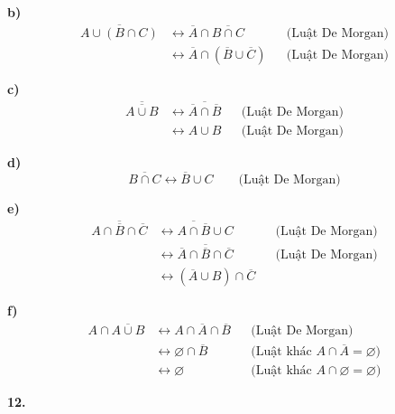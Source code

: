 \documentclass[12pt,a4paper]{article}
\theoremstyle{definition}
\begin{document}
\textbf{b)}
\begin{align*}
\overline{A \cup (B \cap C)} &\leftrightarrow \overline{A} \cap \overline{B \cap C} && \text{(Luật De Morgan)}\\
&\leftrightarrow \overline{A} \cap (\overline{B} \cup \overline{C}) && \text{(Luật De Morgan)}
\end{align*}

\textbf{c)}
\begin{align*}
\overline{\overline{A \cup B}} &\leftrightarrow \overline{\overline{A} \cap \overline{B}} && \text{(Luật De Morgan)}\\
&\leftrightarrow A \cup B && \text{(Luật De Morgan)}
\end{align*}

\textbf{d)}
\[\overline{B \cap C} \leftrightarrow \overline{B} \cup C \qquad \text{(Luật De Morgan)}\]

\textbf{e)}
\begin{align*}
\overline{A \cap \overline{B} \cap \overline{C}} &\leftrightarrow \overline{A \cap \overline{B}} \cup C && \text{(Luật De Morgan)}\\
&\leftrightarrow \overline{A} \cap \overline{\overline{B}} \cap \overline{C} && \text{(Luật De Morgan)}\\
&\leftrightarrow (\overline{A} \cup B) \cap \overline{C}
\end{align*}

\textbf{f)}
\begin{align*}
A \cap \overline{A \cup B} &\leftrightarrow A \cap \overline{A} \cap \overline{B} && \text{(Luật De Morgan)}\\
&\leftrightarrow \varnothing \cap \overline{B} && \text{(Luật khác $A \cap \overline{A} = \varnothing$)}\\
&\leftrightarrow \varnothing && \text{(Luật khác $A \cap \varnothing = \varnothing$)}
\end{align*}

\bigskip
\textbf{12.}
\end{document}

